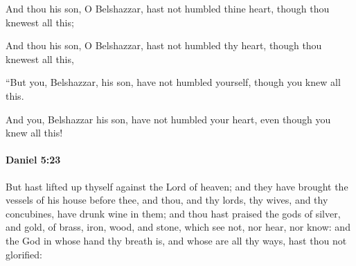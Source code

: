 			And thou his son, O Belshazzar, hast not humbled thine heart, though thou knewest all this;

			\begin{versebox}
					\item[BHS] 
					\item[ASV] And thou his son, O Belshazzar, hast not humbled thy heart, though thou knewest all this,
					\item[NIV] “But you, Belshazzar, his son, have not humbled yourself, though you knew all this.
					\item[NRSV] And you, Belshazzar his son, have not humbled your heart, even though you knew all this!
			\end{versebox}

		\paragraph{Daniel 5:23} %
			\label{DANIEL-5-23}

			But hast lifted up thyself against the Lord of heaven; and they have brought the vessels of his house before thee, and thou, and thy lords, thy wives, and thy concubines, have drunk wine in them; and thou hast praised the gods of silver, and gold, of brass, iron, wood, and stone, which see not, nor hear, nor know: and the God in whose hand thy breath is, and whose are all thy ways, hast thou not glorified:

